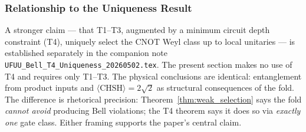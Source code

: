 \subsubsection*{Relationship to the Uniqueness Result}

A stronger claim --- that T1--T3, augmented by a minimum circuit
depth constraint (T4), uniquely select the CNOT Weyl class up to
local unitaries --- is established separately in the companion
note \texttt{UFUU\_Bell\_T4\_Uniqueness\_20260502.tex}. The present
section makes no use of T4 and requires only T1--T3. The physical
conclusions are identical: entanglement from product inputs and
$\langle\mathrm{CHSH}\rangle = 2\sqrt{2}$ as structural consequences
of the fold. The difference is rhetorical precision:
Theorem~\ref{thm:weak_selection} says the fold \emph{cannot avoid}
producing Bell violations; the T4 theorem says it does so via
\emph{exactly one} gate class. Either framing supports the paper's
central claim.

%
%
%

% 

